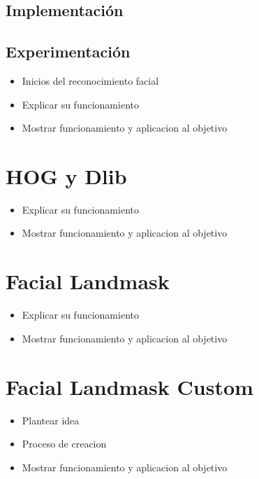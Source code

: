 
\subsection*{Implementación}

\subsection*{Experimentación}

\begin{itemize}
	\item Inicios del reconocimiento facial
	\item Explicar su funcionamiento
	\item Mostrar funcionamiento y aplicacion al objetivo
\end{itemize}



\section{HOG y Dlib}

\begin{itemize}
	\item Explicar su funcionamiento
	\item Mostrar funcionamiento y aplicacion al objetivo
\end{itemize}

\section{Facial Landmask}

\begin{itemize}
	\item Explicar su funcionamiento
	\item Mostrar funcionamiento y aplicacion al objetivo
\end{itemize}

\section{Facial Landmask Custom}

\begin{itemize}
	\item Plantear idea
	\item Proceso de creacion
	\item Mostrar funcionamiento y aplicacion al objetivo
\end{itemize}

